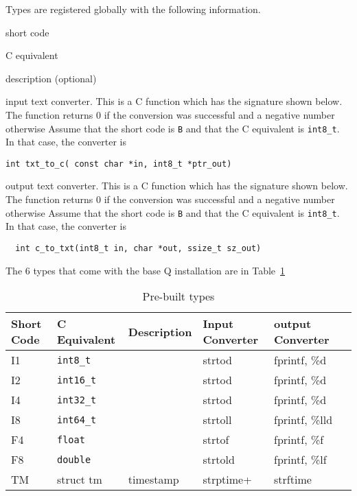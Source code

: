 \documentclass[letterpaper]{article}
\begin{document}
Types are registered globally with the following information. 
\be
\item short code 
\item C equivalent
\item description (optional)
\item input text converter. This is a C function which has the
  signature shown below. 
The function returns 0 if the conversion was successful and a
  negative number otherwise
  Assume that the short code
  is {\tt B} and that the C equivalent is \verb+int8_t+. In that case, the
  converter is 
  \begin{verbatim}
int txt_to_c( const char *in, int8_t *ptr_out)
\end{verbatim}
\item output text converter. This is a C function which has the
  signature shown below. 
The function returns 0 if the conversion was successful and a
  negative number otherwise
  Assume that the short code
  is {\tt B} and that the C equivalent is \verb+int8_t+. In that case, the
  converter is 
  \begin{verbatim}
  int c_to_txt(int8_t in, char *out, ssize_t sz_out)
\end{verbatim}
  \ee

The 6 types that come with the base Q installation are in
Table~\ref{tbl_default_types}

\begin{table}[hb]
\centering
\begin{tabular}{|l|l|l|l|l|l|} \hline \hline
  {\bf Short Code} & {\bf C Equivalent} & {\bf Description} %
  & {\bf Input Converter} & {\bf output Converter} \\ \hline \hline
  I1 & \verb+int8_t+ &  & strtod & fprintf, \%d\\ \hline
  I2 & \verb+int16_t+ & & strtod & fprintf, \%d\\ \hline
  I4 & \verb+int32_t+ & & strtod & fprintf, \%d\\ \hline
  I8 & \verb+int64_t+ & & strtoll & fprintf, \%lld \\ \hline
  F4 & \verb+float+ &   & strtof & fprintf, \%f\\ \hline
  F8 & \verb+double+ &  & strtold & fprintf, \%lf\\ \hline
  TM & struct tm & timestamp & strptime+ & strftime \\ \hline
\hline
\end{tabular}
\caption{Pre-built types}
\label{tbl_default_types}
\end{table}
\end{document}
